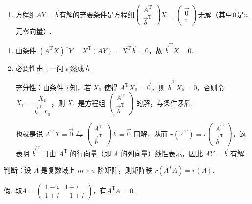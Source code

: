 \begin{exercise}
\begin{exgroup}
\begin{enumerate}
            \item 方程组$AY=\vec{b}$有解的充要条件是方程组$\begin{pmatrix}
                          A^\mathrm{T} \\ \vec{b}^\mathrm{T}
                      \end{pmatrix}X=\begin{pmatrix}
                          \vec{0} \\ 1
                      \end{pmatrix}$无解（其中$\vec{0}$是$n$元零向量）.
        \end{enumerate}
        \begin{answer}
            \begin{enumerate}
                \item 由条件 $(A^\mathrm{T}X)^\mathrm{T}Y=X^\mathrm{T}(AY)=X^\mathrm{T}\vec{b}=0$，故 $\vec{b}^\mathrm{T}X=0$.
                \item 必要性由上一问显然成立.

                充分性：由条件可知，若 $X_0$ 使得 $A^\mathrm{T}X_0=\vec{0}$，则 $\vec{b}^\mathrm{T}X_0=0$，否则令 $X_1 =\dfrac{X_0}{\vec{b}^\mathrm{T}X_0}$，则 $X_1$ 是方程组 $\begin{pmatrix} A^\mathrm{T} \\ \vec{b}^\mathrm{T} \end{pmatrix}$ 的解，与条件矛盾.

                也就是说 $A^\mathrm{T}X=\vec{0}$ 与 $\begin{pmatrix} A^\mathrm{T} \\ \vec{b}^\mathrm{T} \end{pmatrix} X = \vec{0}$ 同解，从而 $r(A^\mathrm{T}) = r\begin{pmatrix} A^\mathrm{T} \\ \vec{b}^\mathrm{T} \end{pmatrix}$，这表明 $\vec{b}^\mathrm{T}$ 可由 $A^\mathrm{T}$ 的行向量（即 $A$ 的列向量）线性表示，因此 $AY=\vec{b}$ 有解.
            \end{enumerate}
        \end{answer}

        \item 判断：设 $A$ 是复数域上 $m \times n$ 阶矩阵，则矩阵秩 $r\left(A^T A\right)=r(A)$.
        \begin{answer}
            假. 取$A=\begin{pmatrix}
                1-i & 1+i  \\
                1+i & -1+i
            \end{pmatrix}$，有$A^\mathrm{T}A=0$.
        \end{answer}


\end{exgroup}
\end{exercise}
